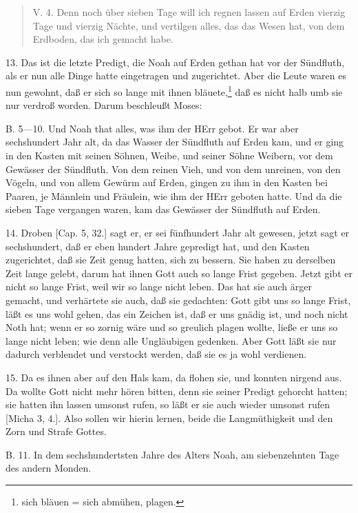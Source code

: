 \begin{quote}
V. 4. Denn noch über sieben Tage will ich regnen lassen auf Erden vierzig Tage und vierzig Nächte, und vertilgen alles, das das Wesen hat, von dem Erdboden, das ich gemacht habe.
\end{quote}

13. Das ist die letzte Predigt, die Noah auf Erden gethan hat vor der Sündfluth, als er nun alle Dinge hatte eingetragen und zugerichtet. Aber die Leute waren es nun gewohnt, daß er sich so lange mit ihnen bläuete,\footnote{sich bläuen = sich abmühen, plagen.} daß es nicht halb umb sie nur verdroß worden. Darum beschleußt Moses:

B. 5—10. Und Noah that alles, was ihm der HErr gebot. Er war aber sechshundert Jahr alt, da das Wasser der Sündfluth auf Erden kam, und er ging in den Kasten mit seinen Söhnen, Weibe, und seiner Söhne Weibern, vor dem Gewässer der Sündfluth. Von dem reinen Vieh, und von dem unreinen, von den Vögeln, und von allem Gewürm auf Erden, gingen zu ihm in den Kasten bei Paaren, je Männlein und Fräulein, wie ihm der HErr geboten hatte. Und da die sieben Tage vergangen waren, kam das Gewässer der Sündfluth auf Erden.

14. Droben [Cap. 5, 32.] sagt er, er sei fünfhundert Jahr alt gewesen, jetzt sagt er sechshundert, daß er eben hundert Jahre gepredigt hat, und den Kasten zugerichtet, daß sie Zeit genug hatten, sich zu bessern. Sie haben zu derselben Zeit lange gelebt, darum hat ihnen Gott auch so lange Frist gegeben. Jetzt gibt er nicht so lange Frist, weil wir so lange nicht leben. Das hat sie auch ärger gemacht, und verhärtete sie auch, daß sie gedachten: Gott gibt uns so lange Frist, läßt es uns wohl gehen, das ein Zeichen ist, daß er uns gnädig ist, und noch nicht Noth hat; wenn er so zornig wäre und so greulich plagen wollte, ließe er uns so lange nicht leben; wie denn alle Ungläubigen gedenken. Aber Gott läßt sie nur dadurch verblendet und verstockt werden, daß sie es ja wohl verdienen.

15. Da es ihnen aber auf den Hals kam, da flohen sie, und konnten nirgend aus. Da wollte Gott nicht mehr hören bitten, denn sie seiner Predigt gehorcht hatten; sie hatten ihn lassen umsonst rufen, so läßt er sie auch wieder umsonst rufen [Micha 3, 4.]. Also sollen wir hierin lernen, beide die Langmüthigkeit und den Zorn und Strafe Gottes.

B. 11. In dem sechshundertsten Jahre des Alters Noah, am siebenzehnten Tage des andern Monden.

